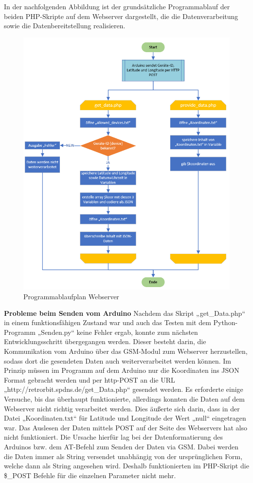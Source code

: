 In der nachfolgenden Abbildung ist der grundsätzliche Programmablauf der beiden PHP-Skripte auf dem Webserver dargestellt, die die Datenverarbeitung sowie die Datenbereitstellung realisieren.
\begin{figure} [H]
	\begin{center}
		\includegraphics[width=1\textwidth]{Bilder/Webserver_PAP.png}
		\caption{Programmablaufplan Webserver}
		\label{server-pap}
	\end{center}
\end{figure}
\textbf{Probleme beim Senden vom Arduino }Nachdem das Skript „get\_Data.php“ in einem funktionsfähigen Zustand war und auch das Testen mit dem Python-Programm „Senden.py“ keine Fehler ergab, konnte zum nächsten Entwicklungsschritt übergegangen werden. Dieser besteht darin, die Kommunikation vom Arduino über das GSM-Modul zum Webserver herzustellen, sodass dort die gesendeten Daten auch weiterverarbeitet werden können.
Im Prinzip müssen im Programm auf dem Arduino nur die Koordinaten ins JSON Format gebracht werden und per http-POST an die URL „http://retrorbit.spdns.de/get\_Data.php“ gesendet werden. Es erforderte einige Versuche, bis das überhaupt funktionierte, allerdings konnten die Daten auf dem Webserver nicht richtig verarbeitet werden. Dies äußerte sich darin, dass in der Datei „Koordinaten.txt“ für Latitude und Longitude der Wert „null“ eingetragen war. Das Auslesen der Daten mittels POST auf der Seite des Webservers hat also nicht funktioniert. Die Ursache hierfür lag bei der Datenformatierung des Arduinos bzw. dem AT-Befehl zum Senden der Daten via GSM. Dabei werden die Daten immer als String versendet unabhängig von der ursprünglichen Form, welche dann als String angesehen wird. Deshalb funktionierten im PHP-Skript die \$\_POST Befehle für die einzelnen Parameter nicht mehr.
